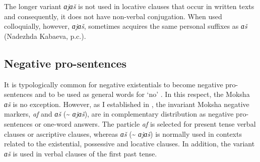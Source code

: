 \documentclass[output=paper]{langsci/langscibook}
\begin{document}
  The longer variant \textit{ɑjɑš} is not used in locative clauses that occur in written texts and consequently, it does not have non-verbal conjugation. When used colloquially, however, \textit{ɑjɑš}, sometimes acquires the same personal suffixes as \textit{ɑš} (Nadezhda Kabaeva, p.c.).

\subsection{Negative pro-sentences}\label{sec:2:5.4}

It is typologically common for negative existentials to become negative pro-sen\-ten\-ces and to be used as general words for `no' \citep[127]{Veselinova2013}. In this respect, the Moksha \textit{ɑš} is no exception. However, as I established in \citet[270--271]{Hamari2007}, the invariant Moksha negative markers, \textit{af} and \textit{ɑš} (\textasciitilde{} \textit{ɑjɑš}), are in complementary distribution as negative pro-sentences or one-word answers. The particle \textit{af} is selected for present tense verbal clauses or ascriptive clauses, whereas \textit{ɑš} (\textasciitilde{} \textit{ɑjɑš}) is normally used in contexts related to the existential, possessive and locative clauses. In addition, the variant \textit{ɑš} is used in verbal clauses of the first past tense.
\end{document}
